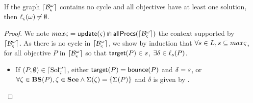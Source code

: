 \begin{theorem}\label{th:approxinf}
If the graph $\lceil \mathcal{B}_\varsigma^\omega\rceil$ contains no cycle and all objectives have at least one solution, then $\ell_\varsigma(\omega) \not\nobreak\mkern -2mu = \emptyset$.
\end{theorem}

\begin{proof}
We note $max\varsigma = \mathsf{update}(\varsigma) \Cap \mathsf{allProcs}(\lceil \mathcal{B}_\varsigma^\omega\rceil)$ the context supported by $\lceil \mathcal{B}_\varsigma^\omega\rceil$.
As there is no cycle in $\lceil \mathcal{B}_\varsigma^\omega\rceil$, we show by induction that $\forall s\in L, s\subseteq max\varsigma$, 
for all objective $P$ in $\lceil \mathcal{B}_\varsigma^\omega\rceil$ so that $\mathsf{target}(P) \in s$,
$\exists \delta \in \ell_s(P)$.%

\begin{itemize}
  \item If $(P, \emptyset) \in \lceil \mathrm{Sol}^\omega_\varsigma\rceil$, either $\mathsf{target}(P) = \mathsf{bounce}(P)$ and $\delta = \varepsilon$,
    or $\forall \zeta \in \mathbf{BS}(P), \zeta \in \mathbf{Sce} \wedge \Sigma(\zeta) = \{ \Sigma(P) \}$ and $\delta$ is given by .


\end{itemize}
\end{proof}
